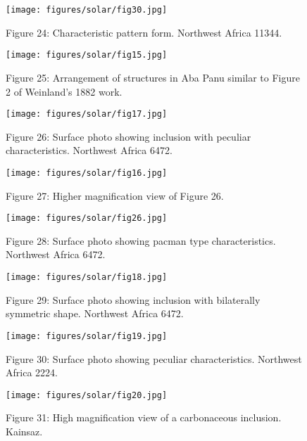 \documentclass[a4paper, 12pt, oneside]{article}
\begin{document}
\begin{figure}[b]
\texttt{[image: figures/solar/fig30.jpg]}
\caption{Figure 24: Characteristic pattern form. Northwest Africa 11344.}
\centering
\end{figure}
\clearpage

\begin{figure}[b]
\centering
\texttt{[image: figures/solar/fig15.jpg]}
\caption{Figure 25: Arrangement of structures in Aba Panu similar to Figure 2 of Weinland's 1882 work.}
\end{figure}
\clearpage

\begin{figure}[b]
\texttt{[image: figures/solar/fig17.jpg]}
\caption{Figure 26: Surface photo showing inclusion with peculiar characteristics. Northwest Africa 6472.}
\centering
\end{figure}
\clearpage

\begin{figure}[b]
\centering
\texttt{[image: figures/solar/fig16.jpg]}
\caption{Figure 27: Higher magnification view of Figure 26.}
\end{figure}
\clearpage

\begin{figure}[b]
\texttt{[image: figures/solar/fig26.jpg]}
\caption{Figure 28: Surface photo showing pacman type characteristics. Northwest Africa 6472.}
\centering
\end{figure}
\clearpage

\begin{figure}[b]
\centering
\texttt{[image: figures/solar/fig18.jpg]}
\caption{Figure 29: Surface photo showing inclusion with bilaterally symmetric shape. Northwest Africa 6472.}
\end{figure}
\clearpage

\begin{figure}[b]
\centering
\texttt{[image: figures/solar/fig19.jpg]}
\caption{Figure 30: Surface photo showing peculiar characteristics. Northwest Africa 2224.}
\end{figure}
\clearpage

\begin{figure}[b]
\centering
\texttt{[image: figures/solar/fig20.jpg]}
\caption{Figure 31: High magnification view of a carbonaceous inclusion. Kainsaz.}
\end{figure}
\clearpage
\end{document}
